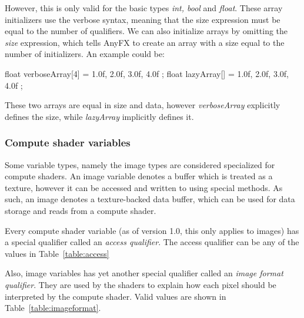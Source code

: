 \documentclass{article}
\begin{document}
However, this is only valid for the basic types \textit{int, bool} and \textit{float}. These array initializers use the verbose syntax, meaning that the size expression must be equal to the number of qualifiers. We can also initialize arrays by omitting the \textit{size} expression, which tells AnyFX to create an array with a size equal to the number of initializers. An example could be:

\begin{CodeBox}
float verboseArray[4]	= { 1.0f, 2.0f, 3.0f, 4.0f };
float lazyArray[]			= { 1.0f, 2.0f, 3.0f, 4.0f };
\end{CodeBox}

These two arrays are equal in size and data, however \textit{verboseArray} explicitly defines the size, while \textit{lazyArray} implicitly defines it.

\subsubsection{Compute shader variables}
Some variable types, namely the image types are considered specialized for compute shaders. An image variable denotes a buffer which is treated as a texture, however it can be accessed and written to using special methods. As such, an image denotes a texture-backed data buffer, which can be used for data storage and reads from a compute shader.

Every compute shader variable (as of version 1.0, this only applies to images) has a special qualifier called an \textit{access qualifier}. The access qualifier can be any of the values in Table~\ref{table:access}

\begin{table}[hp]
\centering
\caption{Access modes}
\label{table:access}
\end{table}

Also, image variables has yet another special qualifier called an \textit{image format qualifier}. They are used by the shaders to explain how each pixel should be interpreted by the compute shader. Valid values are shown in Table~\ref{table:imageformat}.
\end{document}
